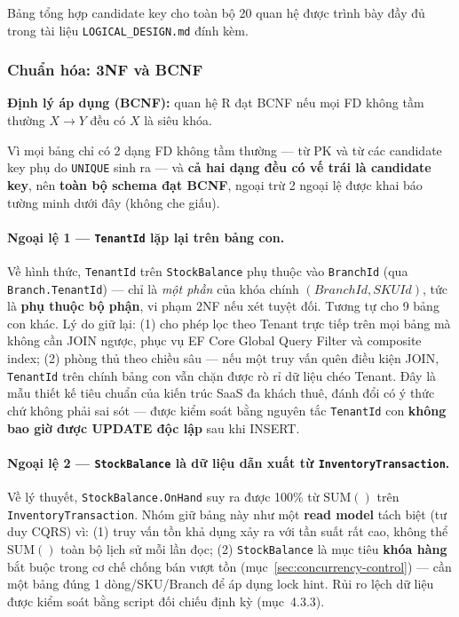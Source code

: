 Bảng tổng hợp candidate key cho toàn bộ 20 quan hệ được trình bày đầy đủ trong tài liệu \texttt{LOGICAL\_DESIGN.md} đính kèm.

\subsubsection{Chuẩn hóa: 3NF và BCNF}
\textbf{Định lý áp dụng (BCNF):} quan hệ R đạt BCNF nếu mọi FD không tầm thường \(X \rightarrow Y\) đều có \(X\) là siêu khóa.

Vì mọi bảng chỉ có 2 dạng FD không tầm thường — từ PK và từ các candidate key phụ do \texttt{UNIQUE} sinh ra — và \textbf{cả hai dạng đều có vế trái là candidate key}, nên \textbf{toàn bộ schema đạt BCNF}, ngoại trừ 2 ngoại lệ được khai báo tường minh dưới đây (không che giấu).

\paragraph{Ngoại lệ 1 — \texttt{TenantId} lặp lại trên bảng con.}
Về hình thức, \texttt{TenantId} trên \texttt{StockBalance} phụ thuộc vào \texttt{BranchId} (qua \texttt{Branch.TenantId}) — chỉ là \emph{một phần} của khóa chính \((BranchId, SKUId)\), tức là \textbf{phụ thuộc bộ phận}, vi phạm 2NF nếu xét tuyệt đối. Tương tự cho 9 bảng con khác. Lý do giữ lại: (1) cho phép lọc theo Tenant trực tiếp trên mọi bảng mà không cần JOIN ngược, phục vụ EF Core Global Query Filter và composite index; (2) phòng thủ theo chiều sâu — nếu một truy vấn quên điều kiện JOIN, \texttt{TenantId} trên chính bảng con vẫn chặn được rò rỉ dữ liệu chéo Tenant. Đây là mẫu thiết kế tiêu chuẩn của kiến trúc SaaS đa khách thuê, đánh đổi có ý thức chứ không phải sai sót — được kiểm soát bằng nguyên tắc \texttt{TenantId} con \textbf{không bao giờ được UPDATE độc lập} sau khi INSERT.

\paragraph{Ngoại lệ 2 — \texttt{StockBalance} là dữ liệu dẫn xuất từ \texttt{InventoryTransaction}.}
Về lý thuyết, \texttt{StockBalance.OnHand} suy ra được 100\% từ \(\text{SUM}()\) trên \texttt{InventoryTransaction}. Nhóm giữ bảng này như một \textbf{read model} tách biệt (tư duy CQRS) vì: (1) truy vấn tồn khả dụng xảy ra với tần suất rất cao, không thể \(\text{SUM}()\) toàn bộ lịch sử mỗi lần đọc; (2) \texttt{StockBalance} là mục tiêu \textbf{khóa hàng} bắt buộc trong cơ chế chống bán vượt tồn (mục~\ref{sec:concurrency-control}) — cần một bảng đúng 1 dòng/SKU/Branch để áp dụng lock hint. Rủi ro lệch dữ liệu được kiểm soát bằng script đối chiếu định kỳ (mục~4.3.3).

